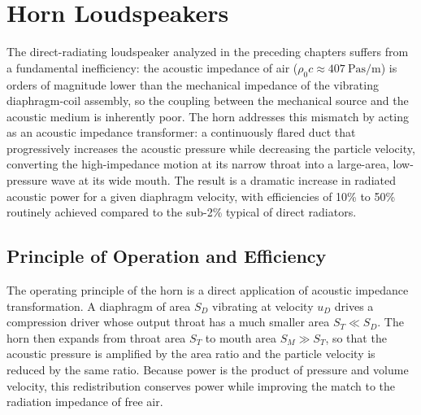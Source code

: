 
\graphicspath{{00_Images/10_chapter/}}

\chapter{Horn Loudspeakers}
\label{ch:horns}

The direct-radiating loudspeaker analyzed in the preceding chapters suffers from a fundamental inefficiency: the acoustic impedance of air (\(\rho_0 c \approx \SI{407}{\pascal\second\per\meter}\)) is orders of magnitude lower than the mechanical impedance of the vibrating diaphragm-coil assembly, so the coupling between the mechanical source and the acoustic medium is inherently poor.
The horn addresses this mismatch by acting as an acoustic impedance transformer: a continuously flared duct that progressively increases the acoustic pressure while decreasing the particle velocity, converting the high-impedance motion at its narrow throat into a large-area, low-pressure wave at its wide mouth.
The result is a dramatic increase in radiated acoustic power for a given diaphragm velocity, with efficiencies of 10\% to 50\% routinely achieved compared to the sub-2\% typical of direct radiators.

\section{Principle of Operation and Efficiency}
\label{sc:101}

The operating principle of the horn is a direct application of acoustic impedance transformation.
A diaphragm of area \(S_D\) vibrating at velocity \(u_D\) drives a compression driver whose output throat has a much smaller area \(S_T \ll S_D\).
The horn then expands from throat area \(S_T\) to mouth area \(S_M \gg S_T\), so that the acoustic pressure is amplified by the area ratio and the particle velocity is reduced by the same ratio.
Because power is the product of pressure and volume velocity, this redistribution conserves power while improving the match to the radiation impedance of free air.

